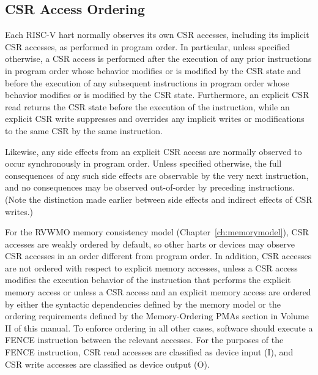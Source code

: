 \subsection*{CSR Access Ordering}

Each RISC-V hart normally observes its own CSR accesses, including its
implicit CSR accesses, as performed in program order.
In particular, unless specified otherwise, a CSR access is performed
after the execution of any prior instructions in program order whose behavior
modifies or is modified by the CSR state and before the execution of any
subsequent instructions in program order whose behavior modifies or is modified
by the CSR state.
Furthermore, an explicit CSR read returns the
CSR state before the execution of the instruction, while an
explicit CSR write suppresses and overrides any implicit writes or
modifications to the same CSR by the same instruction.

Likewise, any side effects from an explicit CSR access are normally
observed to occur synchronously in program order.
Unless specified otherwise, the full consequences of any such side
effects are observable by the very next instruction, and no consequences
may be observed out-of-order by preceding instructions.
(Note the distinction made earlier between side effects and indirect
effects of CSR writes.)

For the RVWMO memory consistency model (Chapter~\ref{ch:memorymodel}),
CSR accesses are weakly ordered by default,
so other harts or devices may observe CSR accesses in an order
different from program order. In addition, CSR accesses are not ordered with
respect to explicit memory accesses, unless a CSR access modifies the execution
behavior of the instruction that performs the explicit memory access or unless
a CSR access and an explicit memory access are ordered by either the syntactic
dependencies defined by the memory model or the ordering requirements defined
by the Memory-Ordering PMAs section in Volume II of this manual. To enforce
ordering in all other cases, software should execute a FENCE instruction
between the relevant accesses. For the purposes of the FENCE instruction, CSR
read accesses are classified as device input (I), and CSR write accesses are
classified as device output (O).

